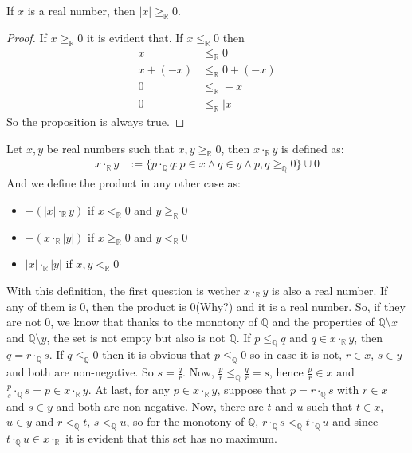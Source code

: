\documentclass{tufte-handout}
\begin{document}
\begin{corollary}
	If $x$ is a real number, then $|x| \ge_\mathbb{R} 0$.
\end{corollary}
\begin{proof}
	If $x \ge_\mathbb{R} 0$ it is evident that. If $x \le_\mathbb{R} 0$ then
	\begin{align*}
		x &\le_\mathbb{R} 0\\
		x + (-x) &\le_\mathbb{R} 0 + (-x)\\
		0 &\le_\mathbb{R} -x\\
		0 &\le_\mathbb{R} |x|
	\end{align*}
	So the proposition is always true.
\end{proof}

\begin{definition}
	Let $x, y$ be real numbers such that $x, y \ge_\mathbb{R} 0$, then $x \cdot_\mathbb{R} y$ is defined as:
	\begin{align*}
		x \cdot_\mathbb{R} y &:= \{p \cdot_\mathbb{Q} q: p \in x \wedge q \in y \wedge p, q \ge_\mathbb{Q} 0\} \cup 0
	\end{align*}
	And we define the product in any other case as:
	\begin{itemize}
		\item $-(|x| \cdot_{\mathbb{R}} y)$ if $x <_\mathbb{R} 0$ and $y \ge_\mathbb{R} 0$
		\item $-(x \cdot_\mathbb{R} |y|)$ if $x \ge_\mathbb{R} 0$ and $y <_\mathbb{R} 0$
		\item $|x| \cdot_\mathbb{R} |y|$ if $x, y <_\mathbb{R} 0$
	\end{itemize}
\end{definition}

With this definition, the first question is wether $x \cdot_\mathbb{R} y$ is also a real number. If any of them is $0$, then the product is $0$(Why?) and it is a real number. So, if they are not $0$, we know that thanks to the monotony of $\mathbb{Q}$ and the properties of $\mathbb{Q} \setminus x$ and $\mathbb{Q} \setminus y$, the set is not empty but also is not $\mathbb{Q}$. If $p \le_\mathbb{Q} q$ and $q \in x \cdot_\mathbb{R} y$, then $q = r \cdot_\mathbb{Q} s$. If $q \le_\mathbb{Q} 0$ then it is obvious that $p \le_\mathbb{Q} 0$ so in case it is not, $r \in x$, $s \in y$ and both are non-negative. So $s = \frac{q}{r}$. Now, $\frac{p}{r} \le_\mathbb{Q} \frac{q}{r} = s$, hence $\frac{p}{r} \in x$ and $\frac{p}{s} \cdot_\mathbb{Q} s = p \in x \cdot_\mathbb{R} y$. At last, for any $p \in x \cdot_\mathbb{R} y$, suppose that $p = r \cdot_\mathbb{Q} s$ with $r \in x$ and $s \in y$ and both are non-negative. Now, there are $t$ and $u$ such that $t \in x$, $u \in y$ and $r <_\mathbb{Q} t$, $s <_\mathbb{Q} u$, so for the monotony of $\mathbb{Q}$, $r \cdot_\mathbb{Q} s <_\mathbb{Q} t \cdot_\mathbb{Q} u$ and since $t \cdot_\mathbb{Q} u \in x \cdot_\mathbb{R}$ it is evident that this set has no maximum.\\
\end{document}

